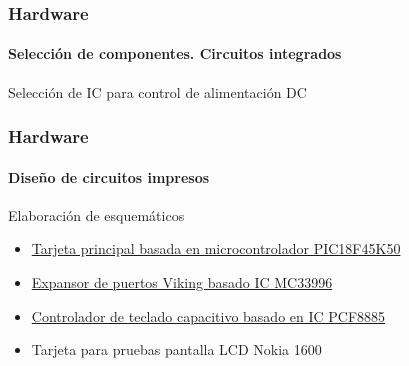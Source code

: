 \documentclass[xcolor=pdftext, table]{beamer}
\begin{document}
	\begin{frame}
		\frametitle{Hardware}	
		\framesubtitle{Selección de componentes. Circuitos integrados}
		
		\begin{block}{Selección de IC para control de alimentación DC}	
			\centering
		\end{block}				
	\end{frame}

	\begin{frame}
		\frametitle{Hardware}	
		\framesubtitle{Diseño de circuitos impresos}
		
		\begin{block}{Elaboración de esquemáticos}
			\begin{itemize}
				\item \href{run:./Documentos/MainBoardSchematic.pdf}{Tarjeta principal basada en microcontrolador PIC18F45K50}
				\item \href{run:./Documentos/PortExpanderMC33996.pdf}%
					{Expansor de puertos Viking basado IC MC33996}
				\item \href{run:./Documentos/CapacitiveKeyboardPCF8885.pdf}%
					{Controlador de teclado capacitivo basado en IC PCF8885}
				\item Tarjeta para pruebas pantalla LCD Nokia 1600
			\end{itemize}
		\end{block}		
		
	\end{frame}
\end{document}
